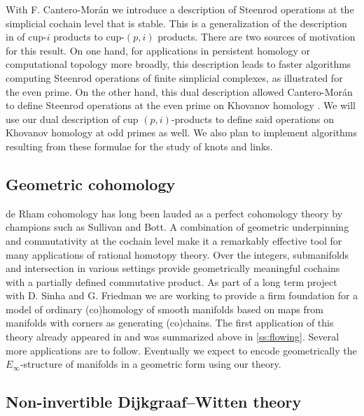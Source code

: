 With F. Cantero-Mor\'{a}n we introduce a description of Steenrod operations at the simplicial cochain level that is stable.
This is a generalization of the description in \cite{medina2023fast_sq} of cup-$i$ products to cup-$(p,i)$ products.
There are two sources of motivation for this result.
On one hand, for applications in persistent homology or computational topology more broadly, this description leads to faster algorithms computing Steenrod operations of finite simplicial complexes, as illustrated for the even prime.
On the other hand, this dual description allowed Cantero-Mor\'an to define Steenrod operations at the even prime on Khovanov homology \cite{cantero-moran2020khovanov}.
We will use our dual description of cup $(p,i)$-products to define said operations on Khovanov homology at odd primes as well.
We also plan to implement algorithms resulting from these formulae for the study of knots and links.

\subsection{Geometric cohomology} \label{ss:geometric cohomology}

de Rham cohomology has long been lauded as a perfect cohomology theory by champions such as Sullivan and Bott.
A combination of geometric underpinning and commutativity at the cochain level make it a remarkably effective tool for many applications of rational homotopy theory.
Over the integers, submanifolds and intersection in various settings provide geometrically meaningful cochains with a partially defined commutative product.
As part of a long term project with D. Sinha and G. Friedman we are working to provide a firm foundation for a model of ordinary (co)homology of smooth manifolds based on maps from manifolds with corners as generating (co)chains.
The first application of this theory already appeared in \cite{medina2021flowing} and was summarized above in \cref{ss:flowing}.
Several more applications are to follow.
Eventually we expect to encode geometrically the $E_\infty$-structure of manifolds in a geometric form using our theory.

\subsection{Non-invertible Dijkgraaf--Witten theory}

